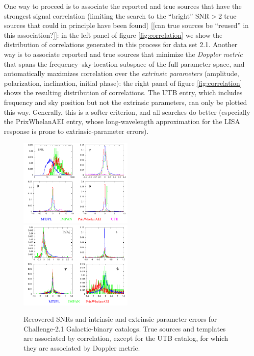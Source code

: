 \documentclass{iopart}
\begin{document}
One way to proceed is to associate the reported and true sources that have the strongest signal correlation (limiting the search to the ``bright'' $\mathrm{SNR} > 2$ true sources that could in principle have been found) [[can true sources be ``reused'' in this association?]]: in the left panel of figure \ref{fig:correlation} we show the distribution of correlations generated in this process for data set 2.1. Another way is to associate reported and true sources that minimize the \emph{Doppler metric} that spans the frequency--sky-location subspace of the full parameter space, and automatically maximizes correlation over the \emph{extrinsic parameters} (amplitude, polarization, inclination, initial phase): the right panel of figure \ref{fig:correlation} shows the resulting distribution of correlations. The UTB entry, which includes frequency and sky position but not the extrinsic parameters, can only be plotted this way. Generally, this is a softer criterion, and all searches do better (especially the PrixWhelanAEI entry, whose long-wavelength approximation for the LISA response is prone to extrinsic-parameter errors).
%
\begin{figure}
\includegraphics[width=0.5\textwidth]{intrinsic}
\includegraphics[width=0.5\textwidth]{extrinsic}
\caption{Recovered SNRs and intrinsic and extrinsic parameter errors for Challenge-2.1 Galactic-binary catalogs. True sources and templates are associated by correlation, except for the UTB catalog, for which they are associated by Doppler metric.\label{fig:paramerrors}}
\end{figure}
\end{document}
